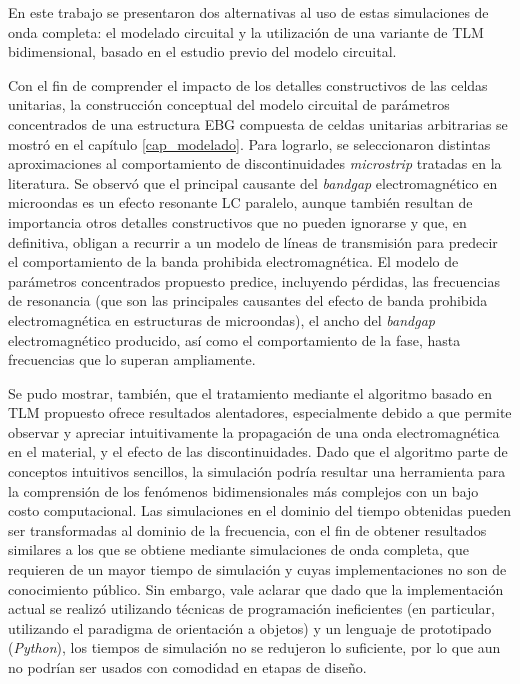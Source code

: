 En este trabajo se presentaron dos alternativas al uso de estas simulaciones de onda completa: el modelado circuital y la utilización de una variante de TLM bidimensional, basado en el estudio previo del modelo circuital.

Con el fin de comprender el impacto de los detalles constructivos de las celdas unitarias, la construcción conceptual del modelo circuital de parámetros concentrados de una estructura EBG compuesta de celdas unitarias arbitrarias se mostró en el capítulo \ref{cap_modelado}. Para lograrlo, se seleccionaron distintas aproximaciones al comportamiento de discontinuidades \textit{microstrip} tratadas en la literatura. Se observó que el principal causante del \textit{bandgap} electromagnético en microondas es un efecto resonante LC paralelo, aunque también resultan de importancia otros detalles constructivos que no pueden ignorarse y que, en definitiva, obligan a recurrir a un modelo de líneas de transmisión para predecir el comportamiento de la banda prohibida electromagnética. El modelo de parámetros concentrados propuesto predice, incluyendo pérdidas, las frecuencias de resonancia (que son las principales causantes del efecto de banda prohibida electromagnética en estructuras de microondas), el ancho del \textit{bandgap} electromagnético producido, así como el comportamiento de la fase, hasta frecuencias que lo superan ampliamente.

Se pudo mostrar, también, que el tratamiento mediante el algoritmo basado en TLM propuesto ofrece resultados alentadores, especialmente debido a que permite observar y apreciar intuitivamente la propagación de una onda electromagnética en el material, y el efecto de las discontinuidades. Dado que el algoritmo parte de conceptos intuitivos sencillos, la simulación podría resultar una herramienta para la comprensión de los fenómenos bidimensionales más complejos con un bajo costo computacional. Las simulaciones en el dominio del tiempo obtenidas pueden ser transformadas al dominio de la frecuencia, con el fin de obtener resultados similares a los que se obtiene mediante simulaciones de onda completa, que requieren de un mayor tiempo de simulación y cuyas implementaciones no son de conocimiento público. Sin embargo, vale aclarar que dado que la implementación actual se realizó utilizando técnicas de programación ineficientes (en particular, utilizando el paradigma de orientación a objetos) y un lenguaje de prototipado (\textit{Python}), los tiempos de simulación no se redujeron lo suficiente, por lo que aun no podrían ser usados con comodidad en etapas de diseño.

